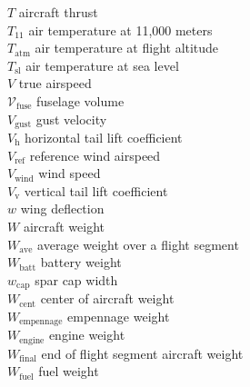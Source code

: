 \begin{multicols}{2}
\begin{tabbing}
$T$ \> aircraft thrust \\ %
$T_{11}$ \> air temperature at 11,000 meters \\ %
$T_{\text{atm}}$ \> air temperature at flight altitude \\ %
$T_{\text{sl}}$ \> air temperature at sea level \\ %
$V$ \> true airspeed \\ %
$\mathcal{V}_{\text{fuse}}$ \>  fuselage volume \\ %
$V_{\text{gust}}$ \>  gust velocity \\ %
$V_{\text{h}}$ \> horizontal tail lift coefficient \\
$V_{\text{ref}}$ \>  reference wind airspeed \\ %
$V_{\text{wind}}$ \>  wind speed \\ %
$V_{\text{v}}$ \> vertical tail lift coefficient \\
$w$ \> wing deflection \\ %
$W$ \> aircraft weight \\ %
$W_{\text{ave}}$ \> average weight over a flight segment \\ %
$W_{\text{batt}}$ \> battery weight \\ %
$w_{\text{cap}}$ \> spar cap width \\ %
$W_{\text{cent}}$ \> center of aircraft weight \\ %
$W_{\text{empennage}}$ \> empennage weight \\ %
$W_{\text{engine}}$ \> engine weight \\ %
$W_{\text{final}}$ \> end of flight segment aircraft weight \\ %
$W_{\text{fuel}}$ \> fuel weight \\ %

\end{tabbing}
\end{multicols}

